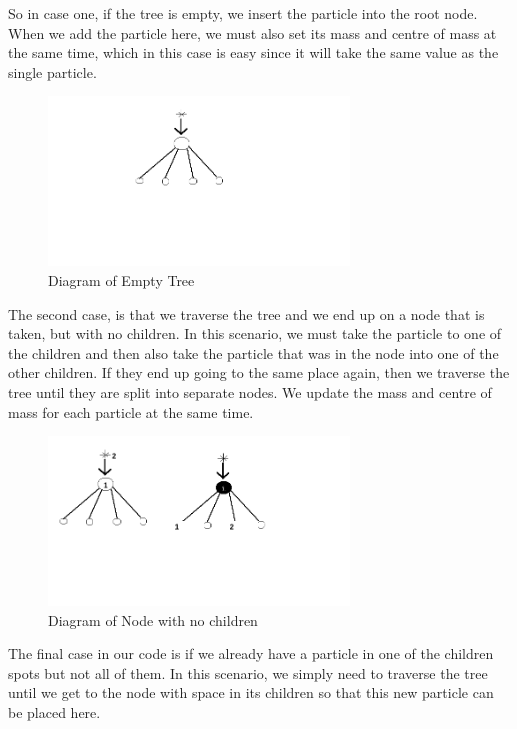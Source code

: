 So in case one, if the tree is empty, we insert the particle into the root node. When we add the particle here, we must also set its mass and centre of mass at the same time, which in this case is easy since it will take the same value as the single particle.
\begin{figure}[htb]
    \begin{center}
        \includegraphics[width=8cm]{../images/empty_tree.png}
        \caption{Diagram of Empty Tree}
    \end{center}
\end{figure}

The second case, is that we traverse the tree and we end up on a node that is taken, but with no children. In this scenario, we must take the particle to one of the children and then also take the particle that was in the node into one of the other children. If they end up going to the same place again, then we traverse the tree until they are split into separate nodes. We update the mass and centre of mass for each particle at the same time.
\begin{figure}[htb]
    \begin{center}
        \includegraphics[width=8cm]{../images/node_no_children.png}
        \caption{Diagram of Node with no children}
    \end{center}
\end{figure}
The final case in our code is if we already have a particle in one of the children spots but not all of them. In this scenario, we simply need to traverse the tree until we get to the node with space in its children so that this new particle can be placed here.

